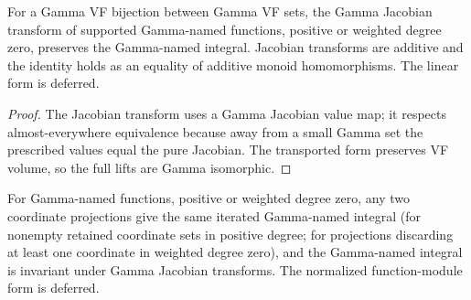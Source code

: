 \begin{proposition}

\label{s7-gn-12}


\leanok

For a Gamma VF bijection between Gamma VF sets, the Gamma Jacobian transform of supported Gamma-named functions, positive or weighted degree zero, preserves the Gamma-named integral. Jacobian transforms are additive and the identity holds as an equality of additive monoid homomorphisms. The linear form is deferred.

\end{proposition}

\begin{proof}


\leanok

The Jacobian transform uses a Gamma Jacobian value map; it respects almost-everywhere equivalence because away from a small Gamma set the prescribed values equal the pure Jacobian. The transported form preserves VF volume, so the full lifts are Gamma isomorphic.

\end{proof}

\begin{theorem}

\label{s7-gn-14}


\leanok

For Gamma-named functions, positive or weighted degree zero, any two coordinate projections give the same iterated Gamma-named integral (for nonempty retained coordinate sets in positive degree; for projections discarding at least one coordinate in weighted degree zero), and the Gamma-named integral is invariant under Gamma Jacobian transforms. The normalized function-module form is deferred.

\end{theorem}

